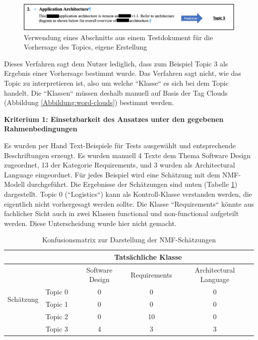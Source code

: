 \begin{figure}[h]
\centering
\includegraphics[scale=0.95]{content/pics/Picture_19.png}
\caption{Verwendung eines Abschnitts aus einem Testdokument für die Vorhersage des Topics, eigene Erstellung}
\label{Abbildung:nmf-inf}
\end{figure}
 
Dieses Verfahren sagt dem Nutzer lediglich, dass zum Beispiel Topic 3 als Ergebnis einer Vorhersage bestimmt wurde. Das Verfahren sagt nicht, wie das Topic zu interpretieren ist, also um welche ``Klasse`` es sich bei dem Topic handelt. Die ``Klassen`` müssen deshalb manuell auf Basis der Tag Clouds (Abbildung \ref{Abbildung:word-clouds}) bestimmt werden.

{\bf Kriterium 1: Einsetzbarkeit des Ansatzes unter den gegebenen Rahmenbedingungen}

Es wurden per Hand Text-Beispiele für Tests ausgewählt und entsprechende Beschriftungen erzeugt. Es wurden manuell 4 Texte dem Thema Software Design zugeordnet, 13 der Kategorie Requirements, und 3 wurden als Architectural Language eingeordnet. Für jedes Beispiel wird eine Schätzung mit dem NMF-Modell durchgeführt. Die Ergebnisse der Schätzungen sind unten (Tabelle \ref{tab:confusion-nmf}) dargestellt. Topic 0 (``Logistics``) kann als Kontroll-Klasse verstanden werden, die eigentlich nicht vorhergesagt werden sollte. Die Klasse ``Requirements`` könnte aus fachlicher Sicht auch in zwei Klassen functional und non-functional aufgeteilt werden. Diese Unterscheidung wurde hier nicht gemacht.

\begin{table}[h]
\centering
\begin{tabular}{|c|c|c|c|c|}
\hline
                           & \multicolumn{4}{c|}{Tatsächliche Klasse}                                  \\ \hline
\multirow{5}{*}{Schätzung} &         & Software Design & Requirements & Architectural Language \\ \cline{2-5} 
                           & Topic 0 & 0               & 0            & 0                      \\ \cline{2-5} 
                           & Topic 1 & 0               & 0            & 0                      \\ \cline{2-5} 
                           & Topic 2 & 0               & 10           & 0                      \\ \cline{2-5} 
                           & Topic 3 & 4               & 3            & 3                      \\ \hline

\end{tabular}
\caption{Konfusionsmatrix zur Darstellung der NMF-Schätzungen}
\label{tab:confusion-nmf}
\end{table}

